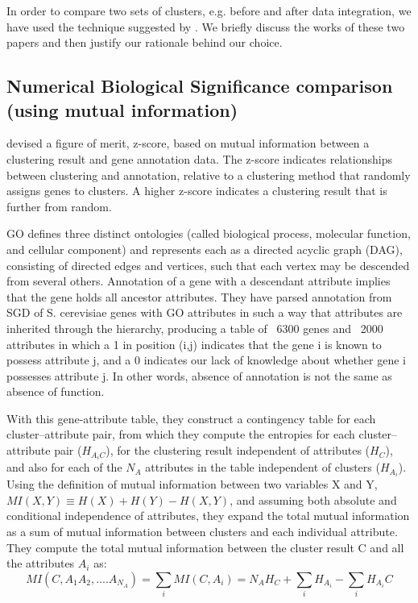 In order to compare two sets of clusters, e.g. before and after data integration, we have used the technique suggested by \citet{Gibons2002Judging}. We briefly discuss 
the works of these two papers and then justify our rationale behind our choice.

\subsection{Numerical Biological Significance comparison (using mutual information)} \label{semisup:num_biosig_mi}
\citet{Gibons2002Judging} devised a figure of merit, z-score, based on mutual information between a clustering result and gene annotation data. The z-score indicates relationships between 
clustering and annotation, relative to a clustering method that randomly assigns genes to clusters. A higher z-score indicates a clustering result that is further 
from random. 

GO defines three distinct ontologies (called biological process, molecular function, and cellular component) and represents each as a directed acyclic graph (DAG), 
consisting of directed edges and vertices, such that each vertex may be descended from several others. Annotation of a gene with a descendant attribute implies that the 
gene holds all ancestor attributes. They have parsed annotation from SGD of S. cerevisiae genes with GO attributes in such a way that attributes are inherited 
through the hierarchy, producing a table of ~6300 genes and ~2000 attributes in which a 1 in position (i,j) indicates that the gene i is known to possess attribute 
j, and a 0 indicates our lack of knowledge about whether gene i possesses attribute j. In other words, absence of annotation is not the same as absence of function.

With this gene-attribute table, they construct a contingency table for each cluster–attribute pair, from which they compute the entropies for each cluster–attribute pair ($H_{A_{i}C}$), 
for the clustering result independent of attributes ($H_{C}$), and also for each of the $N_{A}$ attributes in the table independent of clusters ($H_{A_{i}}$). 
Using the definition of mutual information between two variables X and Y, $MI(X,Y) \equiv H(X)+H(Y)−H(X,Y)$, and assuming both absolute and conditional independence of attributes, 
they expand the total mutual information as a sum of mutual information between clusters and each individual attribute. 
They compute the total mutual information between the cluster result C and all the attributes $A_{i}$ as:
\[
MI(C,A_{1}A_{2},....A_{N_{A}}) = \sum_{i}MI(C,A_{i}) = N_{A}H_{C} + \sum_{i}H_{A_{i}}-\sum_{i}H_{A_{i}}C
\]

